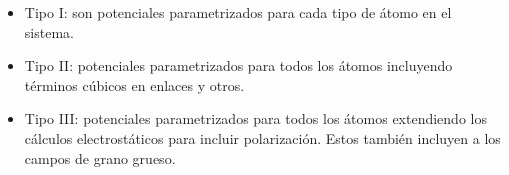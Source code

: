 \begin{itemize}
    \item Tipo I: son potenciales parametrizados para cada tipo de átomo en el sistema.
    \item Tipo II: potenciales parametrizados para todos los átomos incluyendo términos cúbicos en enlaces y otros.
    \item Tipo III: potenciales parametrizados para todos los átomos extendiendo los cálculos electrostáticos para incluir polarización. Estos también incluyen a los campos de grano grueso.
\end{itemize}

